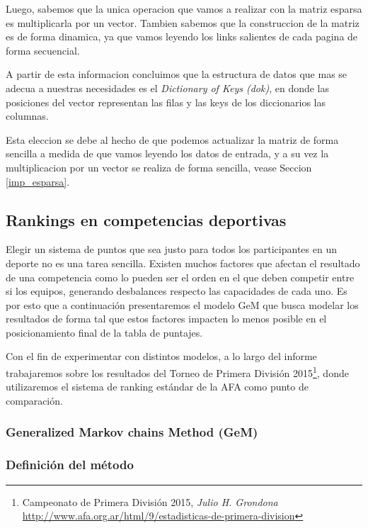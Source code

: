 Luego, sabemos que la unica operacion que vamos a realizar con la matriz esparsa es multiplicarla por un vector. Tambien sabemos que la
construccion de la matriz es de forma dinamica, ya que vamos leyendo los links salientes de cada pagina de forma secuencial.

A partir de esta informacion concluimos que la estructura de datos que mas se adecua a nuestras necesidades es el \textit{Dictionary
of Keys (dok)}, en donde las posiciones del vector representan las filas y las keys de los diccionarios las columnas.

Esta eleccion se debe al hecho de que podemos actualizar la matriz de forma sencilla a medida de que vamos leyendo los datos de entrada, y a su vez
 la multiplicacion por un vector se realiza de forma sencilla, vease Seccion \ref{imp_esparsa}.

\newpage
\subsection{Rankings en competencias deportivas}\label{rankings_deportivos}

Elegir un sistema de puntos que sea justo para todos los participantes en un
deporte no es una tarea sencilla. Existen muchos factores que afectan el
resultado de una competencia como lo pueden ser el orden en el que deben
competir entre si los equipos, generando desbalances respecto las capacidades de
cada uno. Es por esto que a continuación presentaremos el modelo GeM\cite{Govan2008}
 que busca modelar los resultados de forma tal que estos
factores impacten lo menos posible en el posicionamiento final de la tabla de
puntajes.

Con el fin de experimentar con distintos modelos, a lo largo del informe
trabajaremos sobre los resultados del Torneo de Primera División
2015\footnote{Campeonato de Primera División 2015, \textit{Julio H. Grondona} \\
\url{http://www.afa.org.ar/html/9/estadisticas-de-primera-division}}, donde
utilizaremos el sistema de ranking estándar de la AFA como punto de comparación.

\subsubsection{Generalized Markov chains Method (GeM)}
\label{sec:gem_model}

\subsubsection*{Definición del método}


